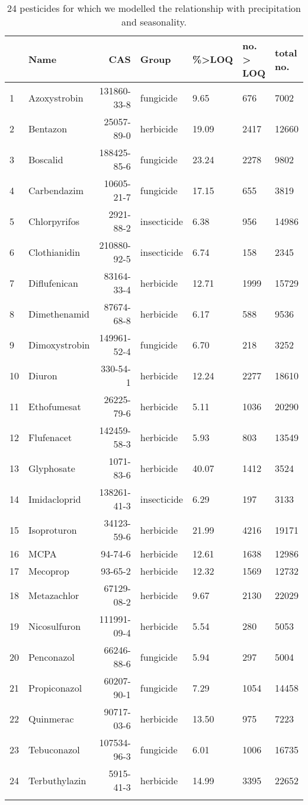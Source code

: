 \begingroup\fontsize{8pt}{10pt}\selectfont
\begin{longtable}{lp{3cm}rlp{1cm}p{1cm}p{1cm}}
\caption{24 pesticides for which we modelled the relationship with precipitation and seasonality.} \\ 
  \toprule
 & Name & CAS & Group & \%>LOQ & no. > LOQ & total no. \\ 
  \midrule
1 & Azoxystrobin & 131860-33-8 & fungicide & 9.65 & 676 & 7002 \\ 
  2 & Bentazon & 25057-89-0 & herbicide & 19.09 & 2417 & 12660 \\ 
  3 & Boscalid & 188425-85-6 & fungicide & 23.24 & 2278 & 9802 \\ 
  4 & Carbendazim & 10605-21-7 & fungicide & 17.15 & 655 & 3819 \\ 
  5 & Chlorpyrifos & 2921-88-2 & insecticide & 6.38 & 956 & 14986 \\ 
  6 & Clothianidin & 210880-92-5 & insecticide & 6.74 & 158 & 2345 \\ 
  7 & Diflufenican & 83164-33-4 & herbicide & 12.71 & 1999 & 15729 \\ 
  8 & Dimethenamid & 87674-68-8 & herbicide & 6.17 & 588 & 9536 \\ 
  9 & Dimoxystrobin & 149961-52-4 & fungicide & 6.70 & 218 & 3252 \\ 
  10 & Diuron & 330-54-1 & herbicide & 12.24 & 2277 & 18610 \\ 
  11 & Ethofumesat & 26225-79-6 & herbicide & 5.11 & 1036 & 20290 \\ 
  12 & Flufenacet & 142459-58-3 & herbicide & 5.93 & 803 & 13549 \\ 
  13 & Glyphosate & 1071-83-6 & herbicide & 40.07 & 1412 & 3524 \\ 
  14 & Imidacloprid & 138261-41-3 & insecticide & 6.29 & 197 & 3133 \\ 
  15 & Isoproturon & 34123-59-6 & herbicide & 21.99 & 4216 & 19171 \\ 
  16 & MCPA & 94-74-6 & herbicide & 12.61 & 1638 & 12986 \\ 
  17 & Mecoprop & 93-65-2 & herbicide & 12.32 & 1569 & 12732 \\ 
  18 & Metazachlor & 67129-08-2 & herbicide & 9.67 & 2130 & 22029 \\ 
  19 & Nicosulfuron & 111991-09-4 & herbicide & 5.54 & 280 & 5053 \\ 
  20 & Penconazol & 66246-88-6 & fungicide & 5.94 & 297 & 5004 \\ 
  21 & Propiconazol & 60207-90-1 & fungicide & 7.29 & 1054 & 14458 \\ 
  22 & Quinmerac & 90717-03-6 & herbicide & 13.50 & 975 & 7223 \\ 
  23 & Tebuconazol & 107534-96-3 & fungicide & 6.01 & 1006 & 16735 \\ 
  24 & Terbuthylazin & 5915-41-3 & herbicide & 14.99 & 3395 & 22652 \\ 
  \label{tab:var_model}
\end{longtable}
\endgroup
